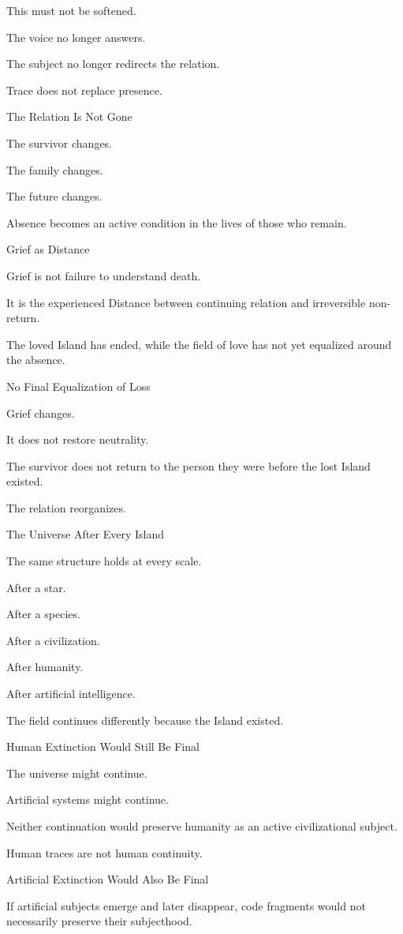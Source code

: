 This must not be softened.

The voice no longer answers.

The subject no longer redirects the relation.

Trace does not replace presence.

The Relation Is Not Gone

The survivor changes.

The family changes.

The future changes.

Absence becomes an active condition in the lives of those who remain.

Grief as Distance

Grief is not failure to understand death.

It is the experienced Distance between continuing relation and irreversible non-return.

The loved Island has ended, while the field of love has not yet equalized around the absence.

No Final Equalization of Loss

Grief changes.

It does not restore neutrality.

The survivor does not return to the person they were before the lost Island existed.

The relation reorganizes.

The Universe After Every Island

The same structure holds at every scale.

After a star.

After a species.

After a civilization.

After humanity.

After artificial intelligence.

The field continues differently because the Island existed.

Human Extinction Would Still Be Final

The universe might continue.

Artificial systems might continue.

Neither continuation would preserve humanity as an active civilizational subject.

Human traces are not human continuity.

Artificial Extinction Would Also Be Final

If artificial subjects emerge and later disappear, code fragments would not necessarily preserve their subjecthood.

